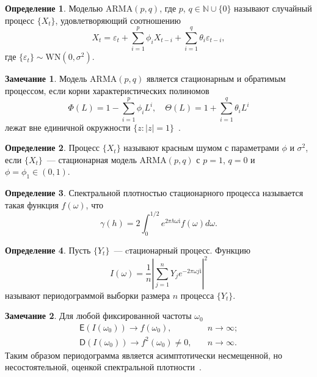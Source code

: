 \documentclass[specialist,
substylefile = spbu_report.rtx,
subf,href,colorlinks=true, 12pt]{disser}
\theoremstyle{definition}
\newtheorem{definition}{Определение}[chapter]
\newtheorem{remark}{Замечание}[chapter]
\newcommand{\im}{\mathrm{i}}
\begin{document}
\begin{definition}
	Моделью $\mathrm{ARMA}(p, q)$, где $p$, $q\in \mathbb{N}\cup\{0\}$ называют случайный процесс $\{X_t\}$, удовлетворяющий соотношению
	\[
		X_t=\varepsilon_t + \sum_{i=1}^p \phi_i X_{t-i} + \sum_{i=1}^q\theta_i\varepsilon_{t-i},
	\]
	где $\{\varepsilon_t\}\sim\mathrm{WN}(0, \sigma^2)$.
\end{definition}
\begin{remark}
	Модель $\mathrm{ARMA}(p, q)$ является стационарным и обратимым процессом, если корни характеристических полиномов
	\[
		\Phi(L)=1-\sum_{i=1}^p \phi_i L^i,\quad \Theta(L)=1+\sum_{i=1}^q \theta_i L^i
	\]
	лежат вне единичной окружности $\{z:|z|=1\}$~\cite[Section 3.4.1]{BoxJenkins2016}.
\end{remark}

\begin{definition}
	Процесс $\{X_t\}$ называют красным шумом с параметрами $\phi$ и $\sigma^2$, если $\{X_t\}$~--- стационарная модель $\mathrm{ARMA}(p, q)$ с $p=1$, $q=0$ и $\phi=\phi_1\in(0, 1)$.
\end{definition}

\begin{definition}
	Спектральной плотностью стационарного процесса называется такая функция $f(\omega)$, что
	\[
		\gamma(h)=2\int_{0}^{1/2} e^{2\pi h\omega\im}f(\omega)d\omega.
	\]
\end{definition}
\begin{definition}
	Пусть $\{Y_t\}$~--- cтационарный процесс. Функцию
	\[
		I(\omega)=\frac1n\left|\sum_{j=1}^{n} Y_je^{-2\pi \omega j\mathrm{i}}\right|^2
	\]
	называют периодограммой выборки размера $n$ процесса $\{Y_t\}$.
\end{definition}
\begin{remark}
	Для любой фиксированной частоты $\omega_0$
	\begin{align*}
		\mathsf{E}\left(I(\omega_0)\right)\to f(\omega_0),\quad       & n\to \infty; \\
		\mathsf{D}\left(I(\omega_0)\right)\to f^2(\omega_0)\ne0,\quad & n\to\infty.
	\end{align*}
	Таким образом периодограмма является асимптотически несмещенной, но несостоятельной, оценкой спектральной плотности~\cite[Раздел 4.5]{Hassler2018}.
\end{remark}
\end{document}
